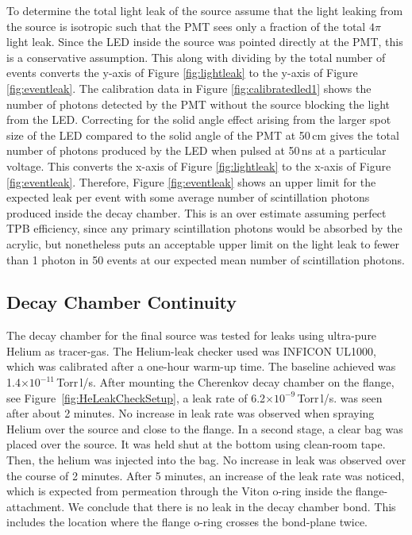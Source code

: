 To determine the total light leak of the source assume that the light leaking from the source is isotropic such that the PMT sees only a fraction of the total $4\pi$ light leak. Since the LED inside the source was pointed directly at the PMT, this is a conservative assumption. This along with dividing by the total number of events converts the y-axis of Figure \ref{fig:lightleak} to the y-axis of Figure \ref{fig:eventleak}. The calibration data in Figure \ref{fig:calibratedled1} shows the number of photons detected by the PMT without the source blocking the light from the LED. Correcting for the solid angle effect arising from the larger spot size of the LED compared to the solid angle of the PMT at 50\,cm gives the total number of photons produced by the LED when pulsed at 50\,ns at a particular voltage. This converts the x-axis of Figure \ref{fig:lightleak} to the x-axis of Figure \ref{fig:eventleak}. Therefore, Figure \ref{fig:eventleak} shows an upper limit for the expected leak per event with some average number of scintillation photons produced inside the decay chamber. This is an over estimate assuming perfect TPB efficiency, since any primary scintillation photons would be absorbed by the acrylic, but nonetheless puts an acceptable upper limit on the light leak to fewer than 1 photon in 50 events at our expected mean number of scintillation photons.

\subsection{Decay Chamber Continuity}
\label{sec:heleak}
The decay chamber for the final source was tested for leaks using ultra-pure Helium as tracer-gas. The Helium-leak checker used was INFICON UL1000, which was calibrated after a one-hour warm-up time. The baseline achieved was 1.4$\times10^{-11}$\,Torr\,l/s. After mounting the Cherenkov decay chamber on the flange, see Figure~\ref{fig:HeLeakCheckSetup}, a leak rate of 6.2$\times10^{-9}$\,Torr\,l/s. was seen after about 2 minutes. No increase in leak rate was observed when spraying Helium over the source and close to the flange. In a second stage, a clear bag was placed over the source. It was held shut at the bottom using clean-room tape. Then, the helium was injected into the bag. No increase in leak was observed over the course of 2 minutes. After 5 minutes, an increase of the leak rate was noticed, which is expected from permeation through the Viton o-ring inside the flange-attachment. We conclude that there is no leak in the decay chamber bond. This includes the location where the flange o-ring crosses the bond-plane twice.

